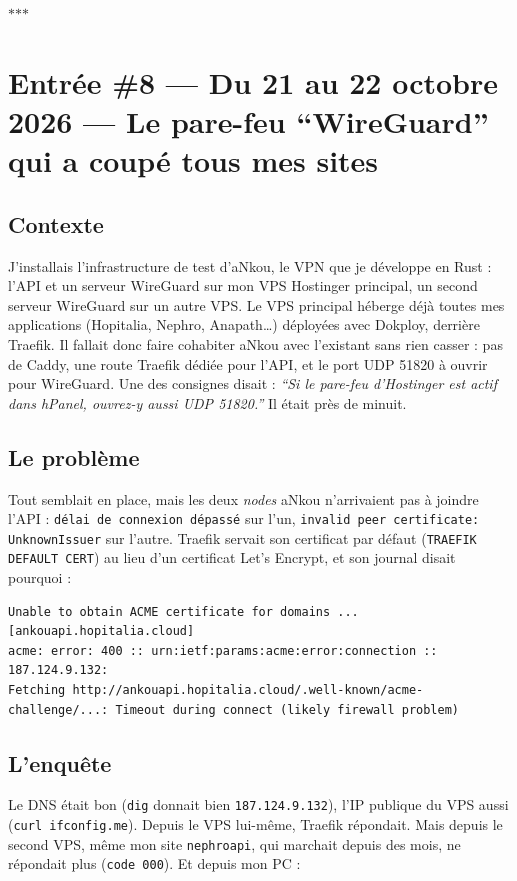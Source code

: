 \documentclass[10pt,twoside,openany]{article}
\newcommand{\entryrule}{\par\vspace{1.2em}\begin{center}\color{accentblue}$\ast$\quad$\ast$\quad$\ast$\end{center}\par}
\begin{document}
\entryrule

\section{Entrée \#8 --- Du 21 au 22 octobre 2026 --- Le pare-feu \enquote{WireGuard} qui a coupé tous mes sites}

\subsection*{Contexte}
J'installais l'infrastructure de test d'aNkou, le VPN que je développe en Rust : l'API et un serveur WireGuard sur mon VPS Hostinger principal, un second serveur WireGuard sur un autre VPS. Le VPS principal héberge déjà toutes mes applications (Hopitalia, Nephro, Anapath\dots{}) déployées avec Dokploy, derrière Traefik. Il fallait donc faire cohabiter aNkou avec l'existant sans rien casser : pas de Caddy, une route Traefik dédiée pour l'API, et le port UDP 51820 à ouvrir pour WireGuard. Une des consignes disait : \textit{\enquote{Si le pare-feu d'Hostinger est actif dans hPanel, ouvrez-y aussi UDP 51820.}} Il était près de minuit.

\subsection*{Le problème}
Tout semblait en place, mais les deux \textit{nodes} aNkou n'arrivaient pas à joindre l'API : \texttt{délai de connexion dépassé} sur l'un, \texttt{invalid peer certificate: UnknownIssuer} sur l'autre. Traefik servait son certificat par défaut (\texttt{TRAEFIK DEFAULT CERT}) au lieu d'un certificat Let's Encrypt, et son journal disait pourquoi :

\begin{lstlisting}
Unable to obtain ACME certificate for domains ... [ankouapi.hopitalia.cloud]
acme: error: 400 :: urn:ietf:params:acme:error:connection :: 187.124.9.132:
Fetching http://ankouapi.hopitalia.cloud/.well-known/acme-challenge/...: Timeout during connect (likely firewall problem)
\end{lstlisting}

\subsection*{L'enquête}
Le DNS était bon (\texttt{dig} donnait bien \texttt{187.124.9.132}), l'IP publique du VPS aussi (\texttt{curl ifconfig.me}). Depuis le VPS lui-même, Traefik répondait. Mais depuis le second VPS, même mon site \texttt{nephroapi}, qui marchait depuis des mois, ne répondait plus (\texttt{code 000}). Et depuis mon PC :
\end{document}
